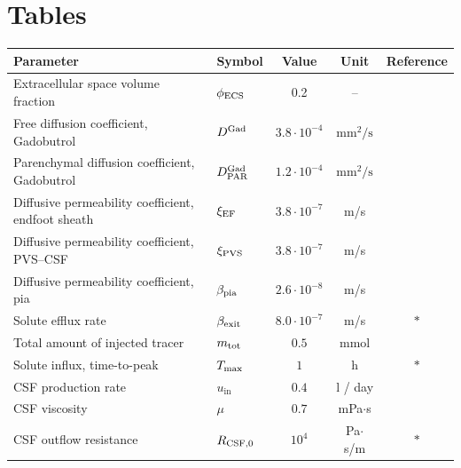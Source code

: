 \documentclass[fleqn,10pt]{wlscirep}
\begin{document}
\FloatBarrier
\section*{Tables}
\begin{table}
  \begin{center}
    \begin{tabular}{ll|ccc}
      \toprule
      Parameter& Symbol & Value & Unit& Reference\\
      \midrule
      Extracellular space volume fraction & $\phi_{\rm ECS}$ & 0.2 & -- & \cite{nicholson1981ion} \\
      Free diffusion coefficient, Gadobutrol & $D^{\rm Gad}$ & $3.8 \cdot 10^{-4}$& $\text{mm}^2/\text{s}$ & \cite{valnes2020apparent}\\
      Parenchymal diffusion coefficient, Gadobutrol & $D^{\rm Gad}_{\rm PAR}$ & $1.2 \cdot 10^{-4}$ & $\text{mm}^2/\text{s}$  & \cite{hornkjol2022csf} \\
      Diffusive permeability coefficient, endfoot sheath & $\xi_{\rm EF}$ & $3.8\cdot 10^{-7}$  & m/s & \cite{koch2023estimates} \\
      Diffusive permeability coefficient, PVS--CSF & $\xi_{\rm PVS}$ & $3.8\cdot 10^{-7}$  & m/s & \cite{koch2023estimates} \\
      Diffusive permeability coefficient, pia & $\beta_{\rm pia}$ & $2.6 \cdot 10^{-8}$ & m/s & \cite{riseth2025twocompartment} \\
      Solute efflux rate & $\beta_{\rm exit}$ & $8.0 \cdot 10^{-7}$ & m/s & $\ast$ \\
      Total amount of injected tracer & $m_{\rm tot}$ & $0.5$ & mmol & \cite{eide2024functional} \\
      Solute influx, time-to-peak & $T_{\rm max}$ & $1$ & h & $\ast$ \\
      CSF production rate & $u_{\mathrm{in}}$ & $0.4$  & l / day & \cite{nilsson1992circadian} \\
      CSF viscosity & $\mu$ & $0.7$ & mPa$ \cdot $s & \cite{bloomfield1998effects} \\ 
      CSF outflow resistance & $R_{\rm CSF, 0}$ & $10^{4}$  & Pa$\cdot$s/m & $\ast$ \\ 

\end{tabular}
\end{center}
\end{table}
\end{document}
